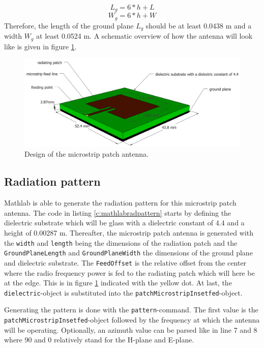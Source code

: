 \begin{equation} 
L_{g} = 6 * h + L
\end{equation}
\begin{equation} 
W_{g} = 6 * h + W
\end{equation}
Therefore, the length of the ground plane $L_{g}$ should be at least 0.0438 m and a width $W_{g}$ at least 0.0524 m.
A schematic overview of how the antenna will look like is given in figure \ref{fig:antennadesign}.
\begin{figure}[h!]
\centering
  \includegraphics[width=\textwidth]{../images/MicrostripAntenna.png}
  \caption{Design of the microstrip patch antenna.}
  \label{fig:antennadesign}
\end{figure}

\subsection{Radiation pattern}
Mathlab is able to generate the radiation pattern for this microstrip patch antenna.
The code in  listing \ref{c:mathlabradpattern} starts by defining the dielectric substrate which will be glass with a dielectric constant
of 4.4 and a height of 0.00287 m. Thereafter, the microstrip patch antenna is generated with the \verb|width| and \verb|length| being the dimensions
of the radiation patch and the \verb|GroundPlaneLength| and \verb|GroundPlaneWidth| the dimensions of the ground plane and dielectric substrate.
The \verb|FeedOffset| is the relative offset from the center where the radio frequency power is fed to the radiating patch which will here be
at the edge. This is in figure \ref{fig:antennadesign} indicated with the yellow dot. At last, the \verb|dielectric|-object is substituted into the 
\verb|patchMicrostripInsetfed|-object.

Generating the pattern is done with the \verb|pattern|-command. The first value is the \\ \verb|patchMicrostripInsetfed|-object followed by the frequency
at which the antenna will be operating. Optionally, an azimuth value can be parsed like in line 7 and 8 where 90 and 0 relatively stand for the H-plane and E-plane.

